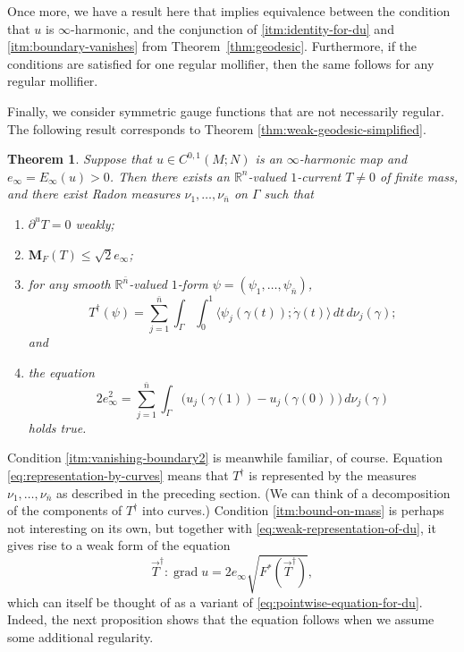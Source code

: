 \documentclass[10pt,a4paper]{amsart}
\newcommand{\R}{\mathbb{R}}
\newcommand{\M}{\mathbf{M}}
\newcommand{\ndim}{{\bar{n}}}
\DeclareMathOperator{\grad}{grad}
\newcommand{\pairing}[2]{\langle #1; #2 \rangle}
\newtheorem{theorem}{Theorem}
\begin{document}
Once more, we have a result here that implies equivalence between the
condition that $u$ is $\infty$-harmonic, and the conjunction of
\ref{itm:identity-for-du} and \ref{itm:boundary-vanishes} from
Theorem~\ref{thm:geodesic}. Furthermore, if the conditions are satisfied for one
regular mollifier, then the same follows for any regular mollifier.

Finally, we consider symmetric gauge functions that are not necessarily regular.
The following result corresponds to Theorem \ref{thm:weak-geodesic-simplified}.


\begin{theorem} \label{thm:geodesic-weak}
Suppose that $u \in C^{0, 1}(M; N)$ is an $\infty$-harmonic map and $e_\infty = E_\infty(u) > 0$. Then there exists an $\R^n$-valued $1$-current $T \neq 0$ of finite mass, and there exist Radon measures $\nu_1, \dotsc, \nu_\ndim$ on $\Gamma$ such that
\begin{enumerate}
\item \label{itm:vanishing-boundary2} $\partial^u T = 0$ weakly;
\item \label{itm:bound-on-mass} $\M_F(T) \le \sqrt{2} e_\infty$;
\item for any smooth $\R^\ndim$-valued $1$-form $\psi = (\psi_1, \dotsc, \psi_\ndim)$,
\begin{equation} \label{eq:representation-by-curves}
T^\dagger(\psi) = \sum_{j = 1}^\ndim \int_\Gamma \int_0^1 \pairing{\psi_j(\gamma(t))}{\dot{\gamma}(t)} \, dt \, d\nu_j(\gamma);
\end{equation}
and
\item \label{itm:weak-representation-of-du} the equation
\begin{equation} \label{eq:weak-representation-of-du}
2e_\infty^2 = \sum_{j = 1}^\ndim \int_\Gamma \bigl(u_j(\gamma(1)) - u_j(\gamma(0))\bigr) \, d\nu_j(\gamma)
\end{equation}
holds true.
\end{enumerate}
\end{theorem}


Condition \ref{itm:vanishing-boundary2} is meanwhile familiar, of course.
Equation \eqref{eq:representation-by-curves} means that $T^\dagger$ is represented by the
measures $\nu_1, \dotsc, \nu_\ndim$ as described in the preceding section.
(We can think of a decomposition of the
components of $T^\dagger$ into curves.)
Condition \ref{itm:bound-on-mass} is perhaps not interesting on its own,
but together with \eqref{eq:weak-representation-of-du}, it gives rise to
a weak form of the equation
\[
\vec{T}^\dagger : \grad u = 2 e_\infty \sqrt{F^*(\vec{T}^\dagger)},
\]
which can itself be thought of as a variant of \eqref{eq:pointwise-equation-for-du}.
Indeed, the next proposition shows that the equation follows when we assume
some additional regularity.
\end{document}
